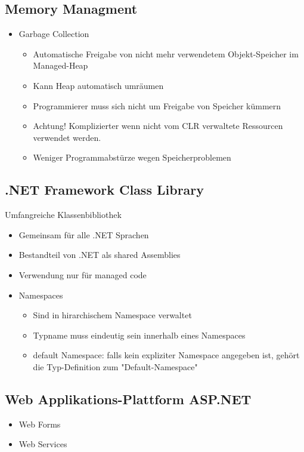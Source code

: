 \subsection{Memory Managment}
\begin{itemize}
	\item Garbage Collection
		\begin{itemize}
			\item Automatische Freigabe von nicht mehr verwendetem Objekt-Speicher im Managed-Heap
			\item Kann Heap automatisch umräumen
			\item Programmierer muss sich nicht um Freigabe von Speicher kümmern
			\item Achtung! Komplizierter wenn nicht vom CLR verwaltete Ressourcen verwendet werden.
			\item Weniger Programmabstürze wegen Speicherproblemen
		\end{itemize}
\end{itemize}

\subsection{.NET Framework Class Library}
Umfangreiche Klassenbibliothek
\begin{itemize}
	\item Gemeinsam für alle .NET Sprachen
	\item Bestandteil von .NET als shared Assemblies
	\item Verwendung nur für managed code
	\item Namespaces
	\begin{itemize}
  	\item Sind in hirarchischem Namespace verwaltet	
  	\item Typname muss eindeutig sein innerhalb eines Namespaces
  	\item default Namespace: falls kein expliziter Namespace angegeben ist,
  	      gehört die Typ-Definition zum "Default-Namespace"
	\end{itemize}
\end{itemize}

\subsection{Web Applikations-Plattform ASP.NET}
\begin{itemize}
	\item Web Forms
	\item Web Services
\end{itemize}

\newpage
